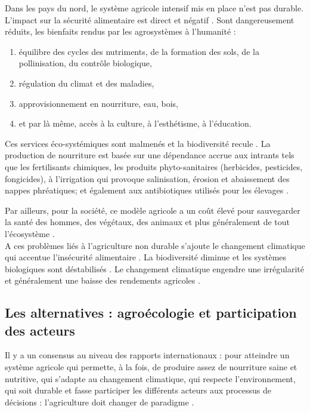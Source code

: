 Dans les pays du nord, le système agricole intensif mis en place n'est pas durable.
L'impact sur la sécurité alimentaire est direct et négatif \cite{fao_biodiversity_2010,mea_ecosystems_2005,pimentel_environmental_2005,fao_statistical_2013,iaastd_agriculture_2008}.
Sont dangereusement réduits, les bienfaits rendus par les agrosystèmes à l'humanité : 
\begin{enumerate}
\item équilibre des cycles des nutriments, de la formation des sols, de la pollinisation, du contrôle biologique,
\item régulation du climat et des maladies,
\item approvisionnement en nourriture, eau, bois,
\item et par là même, accès à la culture, à l'esthétisme, à l'éducation. 
\end{enumerate}
Ces services éco-systémiques sont malmenés et la biodiversité recule \cite{mea_ecosystems_2005}.
La production de nourriture est basée sur une dépendance accrue aux intrants tels que les fertilisants chimiques, les produits phyto-sanitaires (herbicides, pesticides, fongicides), à l'irrigation qui provoque salinisation, érosion et abaissement des nappes phréatiques; et également aux antibiotiques utilisés pour les élevages \cite{fao_biodiversity_2010}.

Par ailleurs, pour la société, ce modèle agricole a un coût élevé pour sauvegarder la santé des hommes, des végétaux, des animaux et plus généralement de tout l'écosystème \cite{pimentel_environmental_2005,bommelear_couts_2011}.\\

A ces problèmes liés à l'agriculture non durable s'ajoute le changement climatique qui accentue l'insécurité alimentaire \cite{smith_agriculture_2007}.
La biodiversité diminue et les systèmes biologiques sont déstabilisés \cite{suarez_les_2002}.
Le changement climatique engendre une irrégularité et généralement une baisse des rendements agricoles \cite{smith_agriculture_2007,lobell_climate_2011}.

\subsection{Les alternatives : agroécologie et participation des acteurs}

Il y a un consensus au niveau des rapports internationaux : 
pour atteindre un système agricole qui permette, à la fois, de produire assez de nourriture saine et nutritive, qui s'adapte au changement climatique, qui respecte l'environnement, qui soit durable et fasse participer les différents acteurs aux processus de décisions : l'agriculture doit changer de paradigme \cite{fao_biodiversity_2010,iaastd_agriculture_2008,mea_ecosystems_2005,fao_declaration_2009,unctad_wake_2013}.

